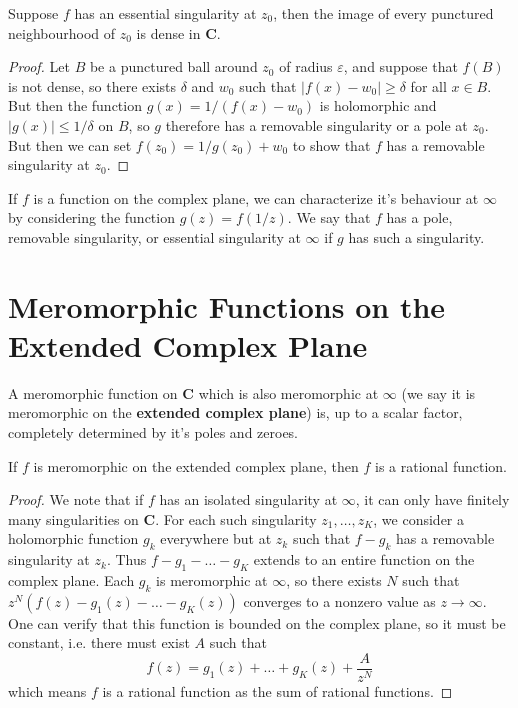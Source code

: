 \begin{theorem}
    Suppose $f$ has an essential singularity at $z_0$, then the image of every punctured neighbourhood of $z_0$ is dense in $\mathbf{C}$.
\end{theorem}
\begin{proof}
    Let $B$ be a punctured ball around $z_0$ of radius $\varepsilon$, and suppose that $f(B)$ is not dense, so there exists $\delta$ and $w_0$ such that $|f(x) - w_0| \geq \delta$ for all $x \in B$. But then the function $g(x) = 1/(f(x) - w_0)$ is holomorphic and $|g(x)| \leq 1/\delta$ on $B$, so $g$ therefore has a removable singularity or a pole at $z_0$. But then we can set $f(z_0) = 1/g(z_0) + w_0$ to show that $f$ has a removable singularity at $z_0$.
\end{proof}

If $f$ is a function on the complex plane, we can characterize it's behaviour at $\infty$ by considering the function $g(z) = f(1/z)$. We say that $f$ has a pole, removable singularity, or essential singularity at $\infty$ if $g$ has such a singularity.

\section{Meromorphic Functions on the Extended Complex Plane}

A meromorphic function on $\mathbf{C}$ which is also meromorphic at $\infty$ (we say it is meromorphic on the {\bf extended complex plane}) is, up to a scalar factor, completely determined by it's poles and zeroes.

\begin{theorem}
    If $f$ is meromorphic on the extended complex plane, then $f$ is a rational function.
\end{theorem}
\begin{proof}
    We note that if $f$ has an isolated singularity at $\infty$, it can only have finitely many singularities on $\mathbf{C}$. For each such singularity $z_1, \dots, z_K$, we consider a holomorphic function $g_k$ everywhere but at $z_k$ such that $f - g_k$ has a removable singularity at $z_k$. Thus $f - g_1 - \dots - g_K$ extends to an entire function on the complex plane. Each $g_k$ is meromorphic at $\infty$, so there exists $N$ such that $z^N(f(z) - g_1(z) - \dots - g_K(z))$ converges to a nonzero value as $z \to \infty$. One can verify that this function is bounded on the complex plane, so it must be constant, i.e. there must exist $A$ such that
    \[ f(z) = g_1(z) + \dots + g_K(z) + \frac{A}{z^N} \]
    which means $f$ is a rational function as the sum of rational functions.
\end{proof}

